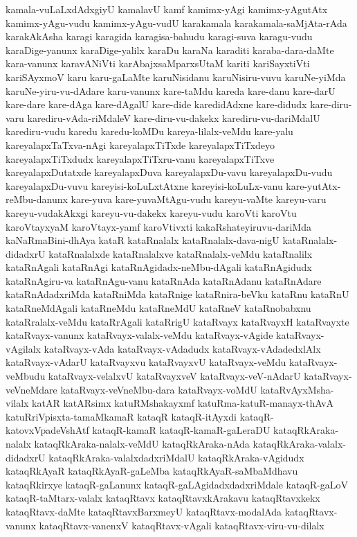 {kamala-vuLaLxdAdxgiyU
kamalavU
kamf
kamimx-yAgi
kamimx-yAgutAtx
kamimx-yAgu-vudu
kamimx-yAgu-vudU
karakamala
karakamala-saMjAta-rAda
karakAkAsha
karagi
karagida
karagisa-bahudu
karagi-suva
karagu-vudu
karaDige-yanunx
karaDige-yalilx
karaDu
karaNa
karaditi
karaba-dara-daMte
kara-vanunx
karavANiVti
karAbajxsaMparxsUtaM
kariti
kariSayxtiVti
kariSAyxmoV
karu
karu-gaLaMte
karuNisidanu
karuNisiru-vuvu
karuNe-yiMda
karuNe-yiru-vu-dAdare
karu-vanunx
kare-taMdu
kareda
kare-danu
kare-darU
kare-dare
kare-dAga
kare-dAgalU
kare-dide
karedidAdxne
kare-didudx
kare-diru-varu
karediru-vAda-riMdaleV
kare-diru-vu-dakekx
karediru-vu-dariMdalU
karediru-vudu
karedu
karedu-koMDu
kareya-lilalx-veMdu
kare-yalu
kareyalapxTaTxva-nAgi
kareyalapxTiTxde
kareyalapxTiTxdeyo
kareyalapxTiTxdudx
kareyalapxTiTxru-vanu
kareyalapxTiTxve
kareyalapxDutatxde
kareyalapxDuva
kareyalapxDu-vavu
kareyalapxDu-vudu
kareyalapxDu-vuvu
kareyisi-koLuLxtAtxne
kareyisi-koLuLx-vanu
kare-yutAtx-reMbu-danunx
kare-yuva
kare-yuvaMtAgu-vudu
kareyu-vaMte
kareyu-varu
kareyu-vudakAkxgi
kareyu-vu-dakekx
kareyu-vudu
karoVti
karoVtu
karoVtayxyaM
karoVtayx-yamf
karoVtivxti
kakaRshateyiruvu-dariMda
kaNaRmaBini-dhAya
kataR
kataRnalalx
kataRnalalx-dava-nigU
kataRnalalx-didadxrU
kataRnalalxde
kataRnalalxve
kataRnalalx-veMdu
kataRnalilx
kataRnAgali
kataRnAgi
kataRnAgidadx-neMbu-dAgali
kataRnAgidudx
kataRnAgiru-va
kataRnAgu-vanu
kataRnAda
kataRnAdanu
kataRnAdare
kataRnAdadxriMda
kataRniMda
kataRnige
kataRnira-beVku
kataRnu
kataRnU
kataRneMdAgali
kataRneMdu
kataRneMdU
kataRneV
kataRnobabxnu
kataRralalx-veMdu
kataRrAgali
kataRrigU
kataRvayx
kataRvayxH
kataRvayxte
kataRvayx-vanunx
kataRvayx-valalx-veMdu
kataRvayx-vAgide
kataRvayx-vAgilalx
kataRvayx-vAda
kataRvayx-vAdadudx
kataRvayx-vAdadedxlAlx
kataRvayx-vAdarU
kataRvayxvu
kataRvayxvU
kataRvayx-veMdu
kataRvayx-veMbudu
kataRvayx-velalxvU
kataRvayxveV
kataRvayx-veV-nAdarU
kataRvayx-veVneMdare
kataRvayx-veVneMbu-dara
kataRvayx-voMdU
kataRvAyxMsha-vilalx
katAR
katARsimx
katuRMshakayxmf
katuRma-katuR-manayx-thAvA
katuRriVpisxta-tamaMkamaR
kataqR
kataqR-itAyxdi
kataqR-katovxVpadeVshAtf
kataqR-kamaR
kataqR-kamaR-gaLeraDU
kataqRkAraka-nalalx
kataqRkAraka-nalalx-veMdU
kataqRkAraka-nAda
kataqRkAraka-valalx-didadxrU
kataqRkAraka-valalxdadxriMdalU
kataqRkAraka-vAgidudx
kataqRkAyaR
kataqRkAyaR-gaLeMba
kataqRkAyaR-saMbaMdhavu
kataqRkirxye
kataqR-gaLanunx
kataqR-gaLAgidadxdadxriMdale
kataqR-gaLoV
kataqR-taMtarx-valalx
kataqRtavx
kataqRtavxkArakavu
kataqRtavxkekx
kataqRtavx-daMte
kataqRtavxBarxmeyU
kataqRtavx-modalAda
kataqRtavx-vanunx
kataqRtavx-vanenxV
kataqRtavx-vAgali
kataqRtavx-viru-vu-dilalx
}
